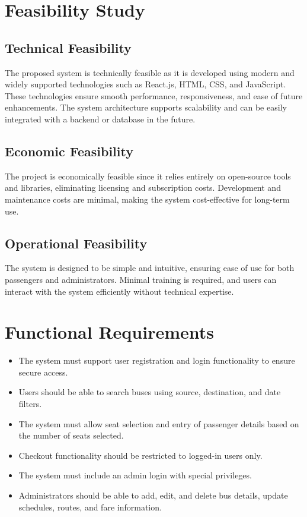 \section{Feasibility Study}

\subsection{Technical Feasibility}
The proposed system is technically feasible as it is developed using modern and widely supported technologies such as React.js, HTML, CSS, and JavaScript. These technologies ensure smooth performance, responsiveness, and ease of future enhancements. The system architecture supports scalability and can be easily integrated with a backend or database in the future.

\subsection{Economic Feasibility}
The project is economically feasible since it relies entirely on open-source tools and libraries, eliminating licensing and subscription costs. Development and maintenance costs are minimal, making the system cost-effective for long-term use.

\subsection{Operational Feasibility}
The system is designed to be simple and intuitive, ensuring ease of use for both passengers and administrators. Minimal training is required, and users can interact with the system efficiently without technical expertise.

\section{Functional Requirements}

\begin{itemize}
    \item The system must support user registration and login functionality to ensure secure access.
    \item Users should be able to search buses using source, destination, and date filters.
    \item The system must allow seat selection and entry of passenger details based on the number of seats selected.
    \item Checkout functionality should be restricted to logged-in users only.
    \item The system must include an admin login with special privileges.
    \item Administrators should be able to add, edit, and delete bus details, update schedules, routes, and fare information.
\end{itemize}

